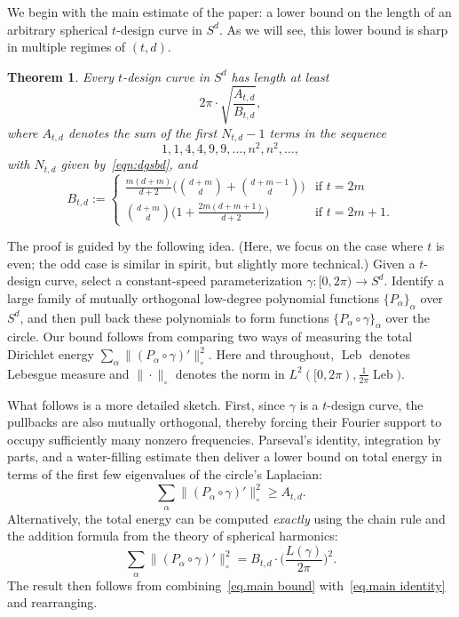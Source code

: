 \documentclass[12pt]{article}
\theoremstyle{plain}
\newtheorem{thm}{Theorem}
\theoremstyle{definition}
\theoremstyle{remark}
\begin{document}
We begin with the main estimate of the paper: a lower bound on the length of an arbitrary spherical $t$-design curve in $S^d$.
As we will see, this lower bound is sharp in multiple regimes of $(t,d)$. 

\begin{thm}
\label{thm.lower bound}
Every $t$-design curve in $S^d$ has length at least
\[
2\pi\cdot\sqrt{\frac{A_{t,d}}{B_{t,d}}},
\]
where $A_{t,d}$ denotes the sum of the first $N_{t,d}-1$ terms in the sequence
\[
1,1,4,4,9,9,\ldots,n^2,n^2,\ldots,
\]
with $N_{t,d}$ given by~\eqref{eqn:dgsbd}, and
\[
B_{t,d}
:=
\left\{
\begin{array}{cl}
\displaystyle
\frac{m(d+m)}{d+2}
\bigg(
\binom{d+m}{d}+\binom{d+m-1}{d}
\bigg)
&\text{if } t=2m\\[12pt]
\displaystyle
\binom{d+m}{d}
\bigg(
1+\frac{2m(d+m+1)}{d+2}
\bigg)
&\text{if } t=2m+1.
\end{array}\right.
\]
\end{thm}

The proof is guided by the following idea.
(Here, we focus on the case where $t$ is even; the odd case is similar in spirit, but slightly more technical.)
Given a $t$-design curve, select a constant-speed parameterization
$\gamma\colon [0,2\pi)\to S^d$.
Identify a large family of mutually orthogonal low-degree polynomial functions $\{P_\alpha\}_\alpha$ over $S^d$, and then pull back these polynomials to form functions $\{P_\alpha\circ\gamma\}_\alpha$ over the circle.
Our bound follows from comparing two ways of measuring the total Dirichlet energy $\sum_\alpha \|(P_\alpha\circ\gamma)'\|_\circ^2$.
Here and throughout, $\operatorname{Leb}$ denotes Lebesgue measure and $\|\cdot\|_\circ$ denotes the norm in $L^2([0,2\pi),\frac{1}{2\pi}\operatorname{Leb})$.


What follows is a more detailed sketch.
First, since $\gamma$ is a $t$-design curve, the pullbacks are also mutually orthogonal, thereby forcing their Fourier support to occupy sufficiently many nonzero frequencies. 
Parseval's identity, integration by parts, and a water-filling estimate then deliver a lower bound on total energy in terms of the first few eigenvalues of the circle's Laplacian: 
\begin{equation}
\label{eq.main bound}
\sum_\alpha \|(P_\alpha\circ\gamma)'\|_\circ^2
\geq A_{t,d}.
\end{equation}
Alternatively, the total energy can be computed \textit{exactly} using the chain rule and the addition formula from the theory of spherical harmonics: 
\begin{equation}
\label{eq.main identity}
\sum_\alpha \|(P_\alpha\circ\gamma)'\|_\circ^2
=B_{t,d}\cdot\bigg(\frac{L(\gamma)}{2\pi}\bigg)^2.
\end{equation}
The result then follows from combining~\eqref{eq.main bound} with~\eqref{eq.main identity} and rearranging.
\end{document}
